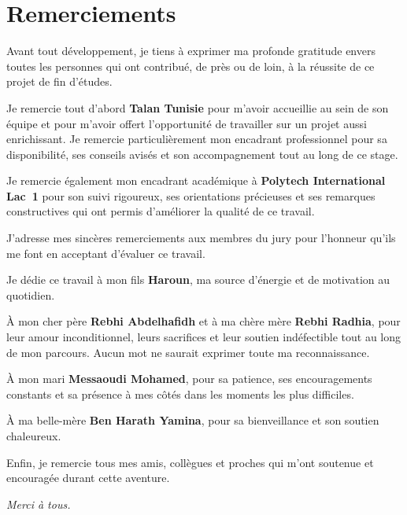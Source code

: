 \chapter*{Remerciements}

\vspace{0.5cm}

Avant tout développement, je tiens à exprimer ma profonde gratitude envers toutes les personnes qui ont contribué, de près ou de loin, à la réussite de ce projet de fin d'études.

\medskip

Je remercie tout d'abord \textbf{Talan Tunisie} pour m'avoir accueillie au sein de son équipe et pour m'avoir offert l'opportunité de travailler sur un projet aussi enrichissant. Je remercie particulièrement mon encadrant professionnel pour sa disponibilité, ses conseils avisés et son accompagnement tout au long de ce stage.

\medskip

Je remercie également mon encadrant académique à \textbf{Polytech International Lac~1} pour son suivi rigoureux, ses orientations précieuses et ses remarques constructives qui ont permis d'améliorer la qualité de ce travail.

\medskip

J'adresse mes sincères remerciements aux membres du jury pour l'honneur qu'ils me font en acceptant d'évaluer ce travail.

\medskip

Je dédie ce travail à mon fils \textbf{Haroun}, ma source d'énergie et de motivation au quotidien.

\medskip

À mon cher père \textbf{Rebhi Abdelhafidh} et à ma chère mère \textbf{Rebhi Radhia}, pour leur amour inconditionnel, leurs sacrifices et leur soutien indéfectible tout au long de mon parcours. Aucun mot ne saurait exprimer toute ma reconnaissance.

\medskip

À mon mari \textbf{Messaoudi Mohamed}, pour sa patience, ses encouragements constants et sa présence à mes côtés dans les moments les plus difficiles.

\medskip

À ma belle-mère \textbf{Ben Harath Yamina}, pour sa bienveillance et son soutien chaleureux.

\medskip

Enfin, je remercie tous mes amis, collègues et proches qui m'ont soutenue et encouragée durant cette aventure.

\vspace{1cm}

\begin{flushright}
\textit{Merci à tous.}
\end{flushright}

\clearpage
